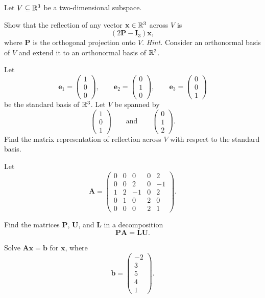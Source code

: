 \documentclass[11pt,oneside]{article}
\begin{document}
\begin{problem}
Let $V\subseteq\mathbb{R}^3$ be a two-dimensional subspace.
\begin{problemsubparts}
\item Show that the reflection of any vector $\mathbf x\in\mathbb{R}^3$ across $V$ is
\[
(2\mathbf P-\mathbf I_3)\mathbf x,
\]
where $\mathbf P$ is the orthogonal projection onto $V$. \textit{Hint.} Consider an orthonormal basis of $V$ and extend it to an orthonormal basis of $\mathbb{R}^3$.
\item Let
\[
\mathbf e_1=
\begin{pmatrix}
1\\0\\0
\end{pmatrix},
\qquad
\mathbf e_2=
\begin{pmatrix}
0\\1\\0
\end{pmatrix},
\qquad
\mathbf e_3=
\begin{pmatrix}
0\\0\\1
\end{pmatrix}
\]
be the standard basis of $\mathbb{R}^3$. Let $V$ be spanned by
\[
\begin{pmatrix}
1\\0\\1
\end{pmatrix}
\qquad\text{and}\qquad
\begin{pmatrix}
0\\1\\2
\end{pmatrix}.
\]
Find the matrix representation of reflection across $V$ with respect to the standard basis.
\end{problemsubparts}
\end{problem}

\begin{problem}
Let
\[
\mathbf A=
\begin{pmatrix}
0&0&0&0&2\\
0&0&2&0&-1\\
1&2&-1&0&2\\
0&1&0&2&0\\
0&0&0&2&1
\end{pmatrix}.
\]
\begin{problemsubparts}
\item Find the matrices $\mathbf P$, $\mathbf U$, and $\mathbf L$ in a decomposition
\[
\mathbf P\mathbf A=\mathbf L\mathbf U.
\]
\item Solve $\mathbf A\mathbf x=\mathbf b$ for $\mathbf x$, where
\[
\mathbf b=
\begin{pmatrix}
-2\\3\\5\\4\\1
\end{pmatrix}.
\]
\end{problemsubparts}
\end{problem}
\end{document}
